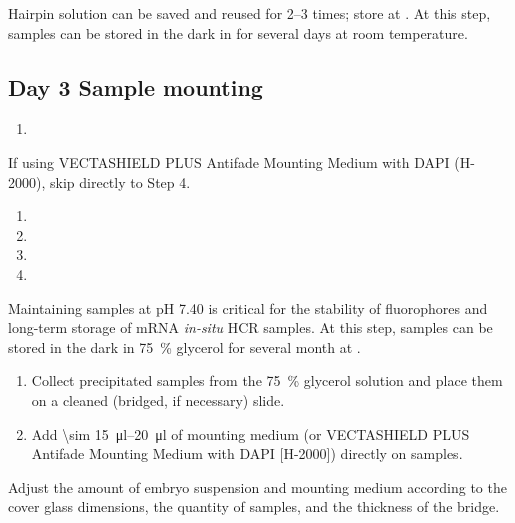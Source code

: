 \documentclass[12pt]{report}
\begin{document}
\bigskip\alert{Hairpin solution can be saved and reused for 2--3 times; store at \minustwenty.}
\alert{At this step, samples can be stored in the dark in \ssct for several days at room temperature.}

\subsection*{Day 3 \textendash{} Sample mounting}

\begin{enumerate}[series = steps]
	\item {}
\end{enumerate}

\bigskip\alert{If using VECTASHIELD\textregistered{} PLUS Antifade Mounting Medium with DAPI (H-2000), skip directly to Step 4.}

\begin{enumerate}[resume = steps]
	\item {}
	\item {}
	\item {}
	\item {}
\end{enumerate}

\bigskip\alert{Maintaining samples at pH 7.40 is critical for the stability of fluorophores and long-term storage of mRNA \textit{in-situ} HCR samples.}
\alert{At this step, samples can be stored in the dark in \qty{75}{\percent} glycerol for several month at \fourdegree.}

\begin{enumerate}[resume = steps]
	\item Collect precipitated samples from the \qty{75}{\percent} glycerol solution and place them on a cleaned (bridged, if necessary) slide.
	\item Add \qtyrange{\sim 15}{20}{\ul} of mounting medium (or VECTASHIELD\textregistered{} PLUS Antifade Mounting Medium with DAPI [H-2000]) directly on samples.
\end{enumerate}

\bigskip\alert{Adjust the amount of embryo suspension and mounting medium according to the cover glass dimensions, the quantity of samples, and the thickness of the bridge.}
\end{document}
